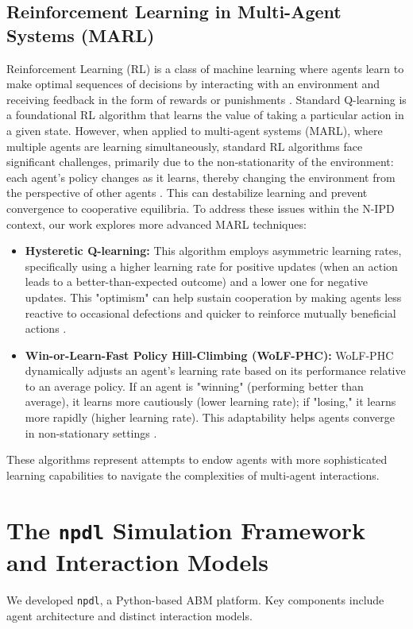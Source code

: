 \documentclass[]{llncs} %
\begin{document}
\subsection{Reinforcement Learning in Multi-Agent Systems (MARL)}
Reinforcement Learning (RL) is a class of machine learning where agents learn to make optimal sequences of decisions by interacting with an environment and receiving feedback in the form of rewards or punishments \cite{SuttonBarto2018}. %
Standard Q-learning is a foundational RL algorithm that learns the value of taking a particular action in a given state. However, when applied to multi-agent systems (MARL), where multiple agents are learning simultaneously, standard RL algorithms face significant challenges, primarily due to the non-stationarity of the environment: each agent's policy changes as it learns, thereby changing the environment from the perspective of other agents \cite{Busoniu2008}. %
This can destabilize learning and prevent convergence to cooperative equilibria. To address these issues within the N-IPD context, our work explores more advanced MARL techniques:
\begin{itemize}
    \item \textbf{Hysteretic Q-learning:} This algorithm employs asymmetric learning rates, specifically using a higher learning rate for positive updates (when an action leads to a better-than-expected outcome) and a lower one for negative updates. This "optimism" can help sustain cooperation by making agents less reactive to occasional defections and quicker to reinforce mutually beneficial actions \cite{Matignon2007Hysteretic}. %
    \item \textbf{Win-or-Learn-Fast Policy Hill-Climbing (WoLF-PHC):} WoLF-PHC dynamically adjusts an agent's learning rate based on its performance relative to an average policy. If an agent is "winning" (performing better than average), it learns more cautiously (lower learning rate); if "losing," it learns more rapidly (higher learning rate). This adaptability helps agents converge in non-stationary settings \cite{Bowling2002WoLF}. %
\end{itemize}
These algorithms represent attempts to endow agents with more sophisticated learning capabilities to navigate the complexities of multi-agent interactions.

\section{The \texttt{npdl} Simulation Framework and Interaction Models}
\label{sec:framework}
We developed \texttt{npdl}, a Python-based ABM platform. Key components include agent architecture and distinct interaction models.
\end{document}
